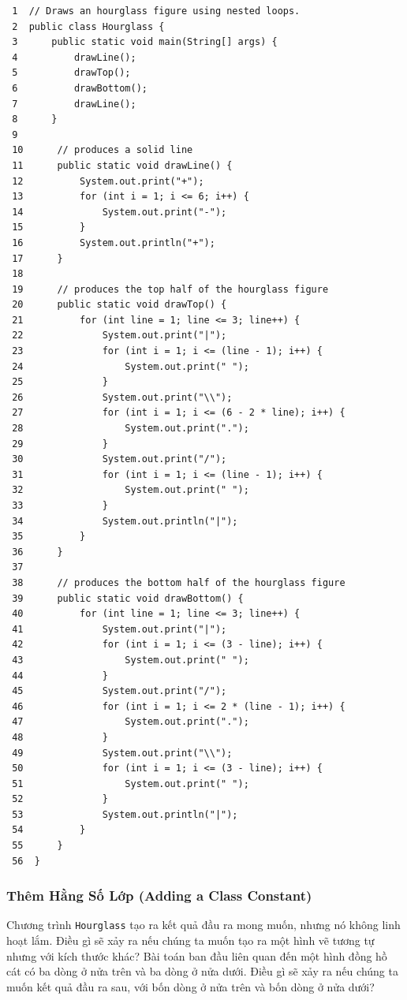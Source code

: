 \begin{verbatim}
 1  // Draws an hourglass figure using nested loops.
 2  public class Hourglass {
 3      public static void main(String[] args) {
 4          drawLine();
 5          drawTop();
 6          drawBottom();
 7          drawLine();
 8      }
 9
 10      // produces a solid line
 11      public static void drawLine() {
 12          System.out.print("+");
 13          for (int i = 1; i <= 6; i++) {
 14              System.out.print("-");
 15          }
 16          System.out.println("+");
 17      }
 18
 19      // produces the top half of the hourglass figure
 20      public static void drawTop() {
 21          for (int line = 1; line <= 3; line++) {
 22              System.out.print("|");
 23              for (int i = 1; i <= (line - 1); i++) {
 24                  System.out.print(" ");
 25              }
 26              System.out.print("\\");
 27              for (int i = 1; i <= (6 - 2 * line); i++) {
 28                  System.out.print(".");
 29              }
 30              System.out.print("/");
 31              for (int i = 1; i <= (line - 1); i++) {
 32                  System.out.print(" ");
 33              }
 34              System.out.println("|");
 35          }
 36      }
 37
 38      // produces the bottom half of the hourglass figure
 39      public static void drawBottom() {
 40          for (int line = 1; line <= 3; line++) {
 41              System.out.print("|");
 42              for (int i = 1; i <= (3 - line); i++) {
 43                  System.out.print(" ");
 44              }
 45              System.out.print("/");
 46              for (int i = 1; i <= 2 * (line - 1); i++) {
 47                  System.out.print(".");
 48              }
 49              System.out.print("\\");
 50              for (int i = 1; i <= (3 - line); i++) {
 51                  System.out.print(" ");
 52              }
 53              System.out.println("|");
 54          }
 55      }
 56  }
\end{verbatim}

\subsubsection{Thêm Hằng Số Lớp (Adding a Class
Constant)}\label{thuxeam-hux1eb1ng-sux1ed1-lux1edbp-adding-a-class-constant}

Chương trình \texttt{Hourglass} tạo ra kết quả đầu ra mong muốn, nhưng
nó không linh hoạt lắm. Điều gì sẽ xảy ra nếu chúng ta muốn tạo ra một
hình vẽ tương tự nhưng với kích thước khác? Bài toán ban đầu liên quan
đến một hình đồng hồ cát có ba dòng ở nửa trên và ba dòng ở nửa dưới.
Điều gì sẽ xảy ra nếu chúng ta muốn kết quả đầu ra sau, với bốn dòng ở
nửa trên và bốn dòng ở nửa dưới?

